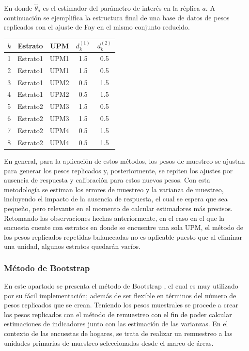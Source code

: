 \documentclass[
  12pt,
  spanish,
]{book}
\begin{document}
En donde \(\hat{\theta}_a\) es el estimador del parámetro de interés en la réplica \(a\). A continuación se ejemplifica la estructura final de una base de datos de pesos replicados con el ajuste de Fay en el mismo conjunto reducido.

\begin{longtable}[]{@{}ccccc@{}}
\toprule
\(k\) & Estrato & UPM & \(d_k^{(1)}\) & \(d_k^{(2)}\) \\
\midrule
\endhead
1 & Estrato1 & UPM1 & 1.5 & 0.5 \\
2 & Estrato1 & UPM1 & 1.5 & 0.5 \\
3 & Estrato1 & UPM2 & 0.5 & 1.5 \\
4 & Estrato1 & UPM2 & 0.5 & 1.5 \\
5 & Estrato2 & UPM3 & 1.5 & 0.5 \\
6 & Estrato2 & UPM3 & 1.5 & 0.5 \\
7 & Estrato2 & UPM4 & 0.5 & 1.5 \\
8 & Estrato2 & UPM4 & 0.5 & 1.5 \\
\bottomrule
\end{longtable}

En general, para la aplicación de estos métodos, los pesos de muestreo se ajustan para generar los pesos replicados y, posteriormente, se repiten los ajustes por ausencia de respuesta y calibración para estos nuevos pesos. Con esta metodología se estiman los errores de muestreo y la varianza de muestreo, incluyendo el impacto de la ausencia de respuesta, el cual se espera que sea pequeño, pero relevante en el momento de calcular estimadores más precisos. Retomando las observaciones hechas anteriormente, en el caso en el que la encuesta cuente con estratos en donde se encuentre una sola UPM, el método de los pesos replicados repetidas balanceadas no es aplicable puesto que al eliminar una unidad, algunos estratos quedarán vacíos.

\hypertarget{muxe9todo-de-bootstrap}{%
\subsubsection*{Método de Bootstrap}\label{muxe9todo-de-bootstrap}}

En este apartado se presenta el método de Bootstrap \citep{EfroTibs93}, el cual es muy utilizado por su fácil implementación; además de ser flexible en términos del número de pesos replicados que se crean. Teniendo los pesos muestrales se procede a crear los pesos replicados con el método de remuestreo con el fin de poder calcular estimaciones de indicadores junto con las estimación de las varianzas. En el contexto de las encuestas de hogares, se trata de realizar un remuestreo a las unidades primarias de muestreo seleccionadas desde el marco de áreas.
\end{document}

